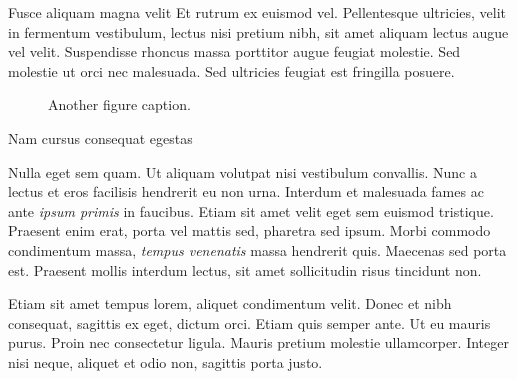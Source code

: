 \documentclass[final]{beamer}
\newlength{\colwidth}
\begin{document}
\begin{frame}[t]
\begin{columns}[t]
\begin{column}{\colwidth}
\begin{block}{Fusce aliquam magna velit}
    Et rutrum ex euismod vel. Pellentesque ultricies, velit in fermentum
    vestibulum, lectus nisi pretium nibh, sit amet aliquam lectus augue vel
    velit. Suspendisse rhoncus massa porttitor augue feugiat molestie. Sed
    molestie ut orci nec malesuada. Sed ultricies feugiat est fringilla
    posuere.

    \begin{figure}
      \centering
      \caption{Another figure caption.}
    \end{figure}

  \end{block}

  \begin{block}{Nam cursus consequat egestas}

    Nulla eget sem quam. Ut aliquam volutpat nisi vestibulum convallis. Nunc a
    lectus et eros facilisis hendrerit eu non urna. Interdum et malesuada fames
    ac ante \textit{ipsum primis} in faucibus. Etiam sit amet velit eget sem
    euismod tristique. Praesent enim erat, porta vel mattis sed, pharetra sed
    ipsum. Morbi commodo condimentum massa, \textit{tempus venenatis} massa
    hendrerit quis. Maecenas sed porta est. Praesent mollis interdum lectus,
    sit amet sollicitudin risus tincidunt non.

    Etiam sit amet tempus lorem, aliquet condimentum velit. Donec et nibh
    consequat, sagittis ex eget, dictum orci. Etiam quis semper ante. Ut eu
    mauris purus. Proin nec consectetur ligula. Mauris pretium molestie
    ullamcorper. Integer nisi neque, aliquet et odio non, sagittis porta justo.


\end{block}
\end{column}
\end{columns}
\end{frame}
\end{document}
